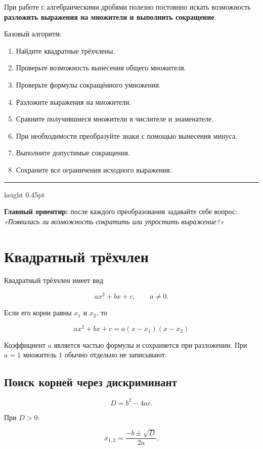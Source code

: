 \documentclass[a4paper,12pt]{article}
\newcommand{\term}[1]{\textbf{\color{darkaccent}#1}}
\newcommand{\important}[1]{\textbf{\color{accent}#1}}
\newcommand{\separator}{%
  \vspace{0.4em}
  {\color{accent}\hrule height 0.45pt}
  \vspace{0.7em}
}
\begin{document}
При работе с алгебраическими дробями полезно постоянно искать возможность
\important{разложить выражения на множители и выполнить сокращение}.

Базовый алгоритм:

\begin{enumerate}
  \item Найдите квадратные трёхчлены.
  \item Проверьте возможность вынесения общего множителя.
  \item Проверьте формулы сокращённого умножения.
  \item Разложите выражения на множители.
  \item Сравните получившиеся множители в числителе и знаменателе.
  \item При необходимости преобразуйте знаки с помощью вынесения минуса.
  \item Выполните допустимые сокращения.
  \item Сохраните все ограничения исходного выражения.
\end{enumerate}

\separator

\term{Главный ориентир:}
после каждого преобразования задавайте себе вопрос:
\emph{«Появилась ли возможность сократить или упростить выражение?»}


\section{Квадратный трёхчлен}

Квадратный трёхчлен имеет вид

\[
ax^2+bx+c,\qquad a\ne0.
\]

Если его корни равны \(x_1\) и \(x_2\), то

\[
\boxed{
ax^2+bx+c=a(x-x_1)(x-x_2)
}
\]

Коэффициент \(a\) является частью формулы и сохраняется при разложении.
При \(a=1\) множитель \(1\) обычно отдельно не записывают.

\subsection{Поиск корней через дискриминант}

\[
D=b^2-4ac.
\]

При \(D>0\):

\[
x_{1,2}=\frac{-b\pm\sqrt D}{2a}.
\]
\end{document}
